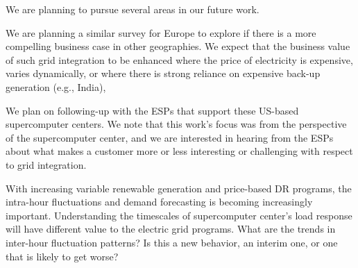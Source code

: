 We are planning to pursue several areas in our future work.

We are planning a similar survey for Europe to explore if there is a more compelling business case 
in other geographies.
We expect that the business value of such grid integration to be enhanced where the price of 
electricity is expensive, varies dynamically, or where there is strong reliance on expensive back-up 
generation (e.g., India),   

We plan on following-up with the ESPs that support these US-based supercomputer 
centers. We note that this work's focus was from the perspective of the supercomputer center, and 
we are interested in hearing from the ESPs about what makes a customer more or less interesting or 
challenging with respect to grid integration.

With increasing variable renewable generation and price-based DR programs, the intra-hour fluctuations 
and demand forecasting is becoming increasingly important. Understanding the timescales of supercomputer 
center's load response will have different value to the electric grid programs. What are the trends 
in inter-hour fluctuation patterns?  Is this a new behavior, an interim one, or one that is likely to get worse?  



